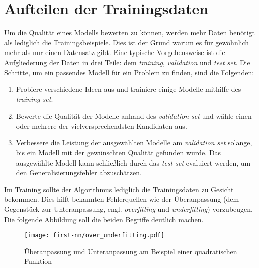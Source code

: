 \section{Aufteilen der Trainingsdaten}
\label{sec:split-train-data}
Um die Qualität eines Modells bewerten zu können, werden
mehr Daten benötigt als lediglich die Trainingsbeispiele.
Dies ist der Grund warum es für gewöhnlich mehr als nur einen
Datensatz gibt. Eine typische Vorgehensweise ist die Aufgliederung der Daten
in drei Teile: dem \textit{training}, \textit{validation} und \textit{test set}.
Die Schritte, um ein passendes Modell für ein Problem zu finden, sind die Folgenden:
\begin{enumerate}
  \item Probiere verschiedene Ideen aus und trainiere einige Modelle mithilfe des
        \textit{training set}.
  \item Bewerte die Qualität der Modelle anhand des \textit{validation set} und wähle
        einen oder mehrere der vielversprechendsten Kandidaten aus.
  \item Verbessere die Leistung der ausgewählten Modelle am \textit{validation set}
        solange, bis ein Modell mit der gewünschten Qualität gefunden wurde.
        Das ausgewählte Modell kann schließlich durch das
        \textit{test set} evaluiert werden, um den Generalisierungsfehler abzuschätzen.
\end{enumerate}
Im Training sollte der Algorithmus lediglich die Trainingsdaten
zu Gesicht bekommen. Dies hilft bekannten
Fehlerquellen wie der Überanpassung (dem Gegenstück zur Unteranpassung, engl.
\textit{overfitting} und \textit{underfitting}) vorzubeugen.
Die folgende Abbildung soll die beiden Begriffe deutlich machen.
\begin{figure}[h!]
  \centering
  \texttt{[image: first-nn/over\_underfitting.pdf]}
  \caption{Überanpassung und Unteranpassung am Beispiel einer
  quadratischen Funktion \parencite[131]{book:hands-on-ml}}
\end{figure}

